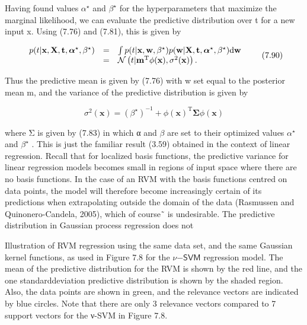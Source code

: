 \documentclass[
  10
]{article}
\begin{document}
Having found values \(\alpha ^ { \star }\) and \(\beta ^ { \star }\) for
the hyperparameters that maximize the marginal likelihood, we can
evaluate the predictive distribution over t for a new input x. Using
(7.76) and (7.81), this is given by

\[
\begin{array}{r c l} p (t | \mathbf {x}, \mathbf {X}, \mathbf {t}, \boldsymbol {\alpha} ^ {\star}, \beta^ {\star}) & = & \int p (t | \mathbf {x}, \mathbf {w}, \beta^ {\star}) p (\mathbf {w} | \mathbf {X}, \mathbf {t}, \boldsymbol {\alpha} ^ {\star}, \beta^ {\star})   \mathrm{d} \mathbf {w} \\ & = & \mathcal {N} \left(t | \mathbf {m} ^ {\mathrm{T}} \phi (\mathbf {x}), \sigma^ {2} (\mathbf {x})\right). \end{array}\tag{7.90}
\]

Thus the predictive mean is given by (7.76) with w set equal to the
posterior mean m, and the variance of the predictive distribution is
given by

\[
\sigma^ {2} (\mathbf {x}) = (\beta^ {\star}) ^ {- 1} + \phi (\mathbf {x}) ^ {\mathrm{T}} \pmb {\Sigma} \phi (\mathbf {x})\tag{7.91}
\]

where Σ is given by (7.83) in which α and \(\beta\) are set to their
optimized values \(\alpha ^ { \star }\) and \(\beta ^ { \star }\) . This
is just the familiar result (3.59) obtained in the context of linear
regression. Recall that for localized basis functions, the predictive
variance for linear regression models becomes small in regions of input
space where there are no basis functions. In the case of an RVM with the
basis functions centred on data points, the model will therefore become
increasingly certain of its predictions when extrapolating outside the
domain of the data (Rasmussen and Quinonero-Candela, 2005), which of
course˜ is undesirable. The predictive distribution in Gaussian process
regression does not

Illustration of RVM regression using the same data set, and the same
Gaussian kernel functions, as used in Figure 7.8 for the
\(\nu { \mathrm { - } } { \mathsf { S V M } }\) regression model. The
mean of the predictive distribution for the RVM is shown by the red
line, and the one standarddeviation predictive distribution is shown by
the shaded region. Also, the data points are shown in green, and the
relevance vectors are indicated by blue circles. Note that there are
only 3 relevance vectors compared to 7 support vectors for the ν-SVM in
Figure 7.8.
\end{document}
